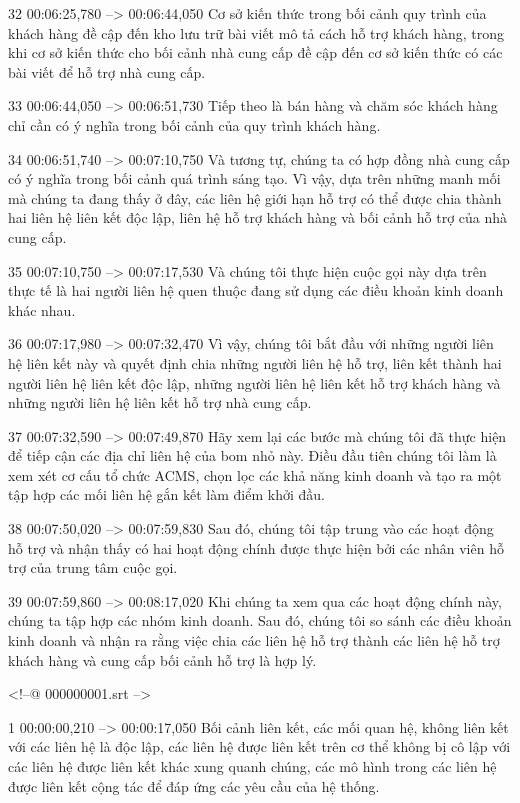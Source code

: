 32
00:06:25,780 --> 00:06:44,050
Cơ sở kiến ​​thức trong bối cảnh quy trình của khách hàng đề cập đến kho lưu trữ bài viết mô tả cách hỗ trợ khách hàng, trong khi cơ sở kiến ​​thức cho bối cảnh nhà cung cấp đề cập đến cơ sở kiến ​​thức có các bài viết để hỗ trợ nhà cung cấp.

33
00:06:44,050 --> 00:06:51,730
Tiếp theo là bán hàng và chăm sóc khách hàng chỉ cần có ý nghĩa trong bối cảnh của quy trình khách hàng.

34
00:06:51,740 --> 00:07:10,750
Và tương tự, chúng ta có hợp đồng nhà cung cấp có ý nghĩa trong bối cảnh quá trình sáng tạo.  Vì vậy, dựa trên những manh mối mà chúng ta đang thấy ở đây, các liên hệ giới hạn hỗ trợ có thể được chia thành hai liên hệ liên kết độc lập, liên hệ hỗ trợ khách hàng và bối cảnh hỗ trợ của nhà cung cấp.

35
00:07:10,750 --> 00:07:17,530
Và chúng tôi thực hiện cuộc gọi này dựa trên thực tế là hai người liên hệ quen thuộc đang sử dụng các điều khoản kinh doanh khác nhau.

36
00:07:17,980 --> 00:07:32,470
Vì vậy, chúng tôi bắt đầu với những người liên hệ liên kết này và quyết định chia những người liên hệ hỗ trợ, liên kết thành hai người liên hệ liên kết độc lập, những người liên hệ liên kết hỗ trợ khách hàng và những người liên hệ liên kết hỗ trợ nhà cung cấp.

37
00:07:32,590 --> 00:07:49,870
Hãy xem lại các bước mà chúng tôi đã thực hiện để tiếp cận các địa chỉ liên hệ của bom nhỏ này.  Điều đầu tiên chúng tôi làm là xem xét cơ cấu tổ chức ACMS, chọn lọc các khả năng kinh doanh và tạo ra một tập hợp các mối liên hệ gắn kết làm điểm khởi đầu.

38
00:07:50,020 --> 00:07:59,830
Sau đó, chúng tôi tập trung vào các hoạt động hỗ trợ và nhận thấy có hai hoạt động chính được thực hiện bởi các nhân viên hỗ trợ của trung tâm cuộc gọi.

39
00:07:59,860 --> 00:08:17,020
Khi chúng ta xem qua các hoạt động chính này, chúng ta tập hợp các nhóm kinh doanh.  Sau đó, chúng tôi so sánh các điều khoản kinh doanh và nhận ra rằng việc chia các liên hệ hỗ trợ thành các liên hệ hỗ trợ khách hàng và cung cấp bối cảnh hỗ trợ là hợp lý.

<!--@ 000000001.srt -->

1
00:00:00,210 --> 00:00:17,050
Bối cảnh liên kết, các mối quan hệ, không liên kết với các liên hệ là độc lập, các liên hệ được liên kết trên cơ thể không bị cô lập với các liên hệ được liên kết khác xung quanh chúng, các mô hình trong các liên hệ được liên kết cộng tác để đáp ứng các yêu cầu của hệ thống.

